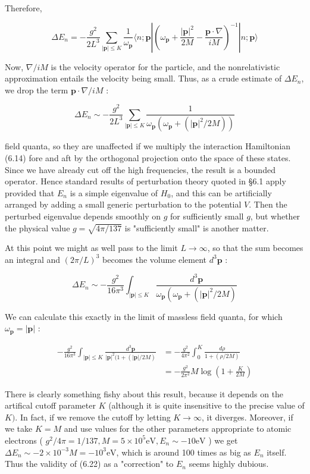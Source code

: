 \documentclass[10pt, letterpaper]{article}
\begin{document}
Therefore,

$$
\Delta E_{n}=-\frac{g^{2}}{2 L^{3}} \sum_{|\mathbf{p}| \leq K} \frac{1}{\omega_{\mathbf{p}}}\langle n ; \mathbf{p}|\left(\omega_{\mathbf{p}}+\frac{|\mathbf{p}|^{2}}{2 M}-\frac{\mathbf{p} \cdot \nabla}{i M}\right)^{-1}|n ; \mathbf{p}\rangle
$$

Now, $\nabla / i M$ is the velocity operator for the particle, and the nonrelativistic approximation entails the velocity being small. Thus, as a crude estimate of $\Delta E_{n}$, we drop the term $\mathbf{p} \cdot \nabla / i M$ :

$$
\Delta E_{n} \sim-\frac{g^{2}}{2 L^{3}} \sum_{|\mathbf{p}| \leq K} \frac{1}{\omega_{\mathbf{p}}\left(\omega_{\mathbf{p}}+\left(|\mathbf{p}|^{2} / 2 M\right)\right)}
$$

field quanta, so they are unaffected if we multiply the interaction Hamiltonian (6.14) fore and aft by the orthogonal projection onto the space of these states. Since we have already cut off the high frequencies, the result is a bounded operator. Hence standard results of perturbation theory quoted in §6.1 apply provided that $E_{n}$ is a simple eigenvalue of $H_{0}$, and this can be artificially arranged by adding a small generic perturbation to the potential $V$. Then the perturbed eigenvalue depends smoothly on $g$ for sufficiently small $g$, but whether the physical value $g=\sqrt{4 \pi / 137}$ is "sufficiently small" is another matter.

At this point we might as well pass to the limit $L \rightarrow \infty$, so that the sum becomes an integral and $(2 \pi / L)^{3}$ becomes the volume element $d^{3} \mathbf{p}$ :

$$
\Delta E_{n} \sim-\frac{g^{2}}{16 \pi^{3}} \int_{|\mathbf{p}| \leq K} \frac{d^{3} \mathbf{p}}{\omega_{\mathbf{p}}\left(\omega_{\mathbf{p}}+\left(|\mathbf{p}|^{2} / 2 M\right)\right.}
$$

We can calculate this exactly in the limit of massless field quanta, for which $\omega_{\mathbf{p}}= |\mathbf{p}|$ :

$$
\begin{aligned}
-\frac{g^{2}}{16 \pi^{3}} \int_{|\mathbf{p}| \leq K} \frac{d^{3} \mathbf{p}}{|\mathbf{p}|^{2}(1+(|\mathbf{p}| / 2 M)} & =-\frac{g^{2}}{4 \pi^{2}} \int_{0}^{K} \frac{d \rho}{1+(\rho / 2 M)} \\
& =-\frac{g^{2}}{2 \pi^{2}} M \log \left(1+\frac{K}{2 M}\right)
\end{aligned}
$$

There is clearly something fishy about this result, because it depends on the artifical cutoff parameter $K$ (although it is quite insensitive to the precise value of $K)$. In fact, if we remove the cutoff by letting $K \rightarrow \infty$, it diverges. Moreover, if we take $K=M$ and use values for the other parameters appropriate to atomic electrons ( $g^{2} / 4 \pi=1 / 137, M=5 \times 10^{5} \mathrm{eV}, E_{n} \sim-10 \mathrm{eV}$ ) we get $\Delta E_{n} \sim-2 \times 10^{-3} M= -10^{3} \mathrm{eV}$, which is around 100 times as big as $E_{n}$ itself. Thus the validity of (6.22) as a "correction" to $E_{n}$ seems highly dubious.
\end{document}
